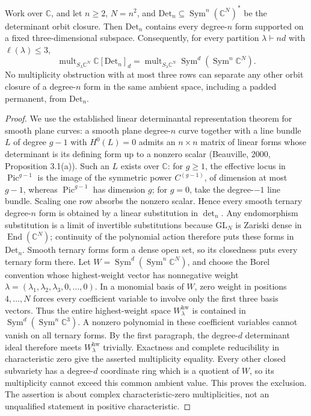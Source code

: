 \begin{proposition}\label{G-05}
Work over $\mathbb C$, and let $n\geq2$, $N=n^2$, and $\mathrm{Det}_n\subseteq\operatorname{Sym}^n(\mathbb C^N)^*$ be the determinant orbit closure. Then $\mathrm{Det}_n$ contains every degree-$n$ form supported on a fixed three-dimensional subspace. Consequently, for every partition $\lambda\vdash nd$ with $\ell(\lambda)\leq3$,
\[
 \operatorname{mult}_{S_\lambda\mathbb C^N}\mathbb C[\mathrm{Det}_n]_d
 =\operatorname{mult}_{S_\lambda\mathbb C^N}\operatorname{Sym}^d(\operatorname{Sym}^n\mathbb C^N).
\]
No multiplicity obstruction with at most three rows can separate any other orbit closure of a degree-$n$ form in the same ambient space, including a padded permanent, from $\mathrm{Det}_n$.
\end{proposition}
\begin{proof}
We use the established linear determinantal representation theorem for smooth plane curves: a smooth plane degree-$n$ curve together with a line bundle $L$ of degree $g-1$ with $H^0(L)=0$ admits an $n\times n$ matrix of linear forms whose determinant is its defining form up to a nonzero scalar (Beauville, 2000, Proposition 3.1(a)). Such an $L$ exists over $\mathbb C$: for $g\geq1$, the effective locus in $\operatorname{Pic}^{g-1}$ is the image of the symmetric power $C^{(g-1)}$, of dimension at most $g-1$, whereas $\operatorname{Pic}^{g-1}$ has dimension $g$; for $g=0$, take the degree-$-1$ line bundle. Scaling one row absorbs the nonzero scalar. Hence every smooth ternary degree-$n$ form is obtained by a linear substitution in $\det_n$. Any endomorphism substitution is a limit of invertible substitutions because $\mathrm{GL}_N$ is Zariski dense in $\operatorname{End}(\mathbb C^N)$; continuity of the polynomial action therefore puts these forms in $\mathrm{Det}_n$. Smooth ternary forms form a dense open set, so its closedness puts every ternary form there.
Let $W=\operatorname{Sym}^d(\operatorname{Sym}^n\mathbb C^N)$, and choose the Borel convention whose highest-weight vector has nonnegative weight $\lambda=(\lambda_1,\lambda_2,\lambda_3,0,\ldots,0)$. In a monomial basis of $W$, zero weight in positions $4,\ldots,N$ forces every coefficient variable to involve only the first three basis vectors. Thus the entire highest-weight space $W_\lambda^{\mathrm{hw}}$ is contained in $\operatorname{Sym}^d(\operatorname{Sym}^n\mathbb C^3)$. A nonzero polynomial in these coefficient variables cannot vanish on all ternary forms. By the first paragraph, the degree-$d$ determinant ideal therefore meets $W_\lambda^{\mathrm{hw}}$ trivially. Exactness and complete reducibility in characteristic zero give the asserted multiplicity equality. Every other closed subvariety has a degree-$d$ coordinate ring which is a quotient of $W$, so its multiplicity cannot exceed this common ambient value. This proves the exclusion. The assertion is about complex characteristic-zero multiplicities, not an unqualified statement in positive characteristic.
\end{proof}

